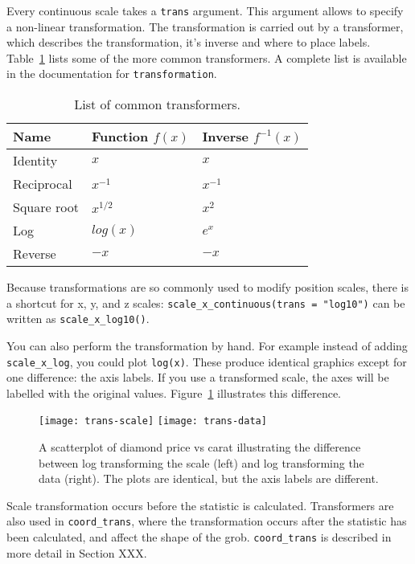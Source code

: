 Every continuous scale takes a {\tt trans} argument.  This argument allows to specify a non-linear transformation.  The transformation is carried out by a transformer, which describes the transformation, it's inverse and where to place labels. Table~\ref{tbl:common-trans} lists some of the more common transformers. A complete list is available in the documentation for {\tt transformation}.

\begin{table}
  \centering
  \begin{tabular}{lll}
    Name & Function $f(x)$ & Inverse $f^{-1}(x)$ \\
    \hline
    Identity    & $x$         & $x$      \\
    Reciprocal  & $x^{-1}$    & $x^{-1}$ \\
    Square root & $x^{1/2}$   & $x ^ 2$  \\
    Log         & $log(x)$    & $e ^ x$  \\
    Reverse     & $-x$        & $-x$     \\
  \end{tabular}
  \caption{List of common transformers.}
  \label{tbl:common-trans}
\end{table}

Because transformations are so commonly used to modify position scales, there is a shortcut for x, y, and z scales: \verb|scale_x_continuous(trans = "log10")| can be written as \verb|scale_x_log10()|.

You can also perform the transformation by hand.  For example instead of adding {\tt scale\_x\_log}, you could plot {\tt log(x)}.  These produce identical graphics except for one difference: the axis labels.  If you use a transformed scale, the axes will be labelled with the original values.  Figure~\ref{fig:trans} illustrates this difference.

\begin{figure}[htbp]
  \centering
    \texttt{[image: trans-scale]}
    \texttt{[image: trans-data]}
  \caption{A scatterplot of diamond price vs carat illustrating the difference between log transforming the scale (left) and log transforming the data (right).  The plots are identical, but the axis labels are different.}
  \label{fig:trans}
\end{figure}

Scale transformation occurs before the statistic is calculated.  Transformers are also used in \verb|coord_trans|, where the transformation occurs after the statistic has been calculated, and affect the shape of the grob.  \verb|coord_trans| is described in more detail in Section XXX.

